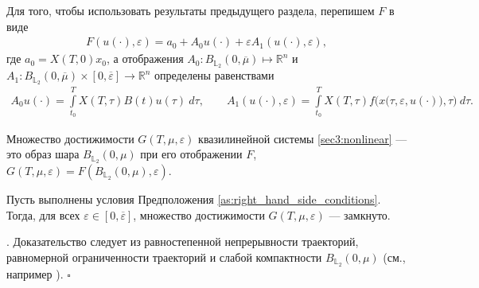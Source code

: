\documentclass[../main.tex]{subfiles}
\begin{document}
Для того, чтобы использовать результаты предыдущего раздела, перепишем  $F$ в виде
\begin{gather*}
	F(u(\cdot),\varepsilon) = a_0 + A_0 u(\cdot) + \varepsilon A_1(u(\cdot), \varepsilon), 
\end{gather*}
где $a_0 = X(T,0)x_0 $, а отображения $A_0: B_{\mathbb{L}_2}(0,\overline{\mu})  \mapsto \mathbb{R}^n$ и $A_1: B_{\mathbb{L}_2}(0,\overline{\mu}) \times [0,\overline{\varepsilon}] \to \mathbb{R}^n$ определены равенствами
\begin{gather}\label{A1_def}
	A_0 u(\cdot) = \int\limits_{t_0}^T X(T,\tau) B(t)u(\tau)\ d\tau, \qquad
	A_1(u(\cdot),\varepsilon) = \int\limits_{t_0}^T X(T,\tau) f\Big(x\big(\tau,\varepsilon, u(\cdot)\big),\tau\Big) \ d\tau.
\end{gather}

Множество достижимости $G(T,\mu,\varepsilon) $  квазилинейной системы \eqref{sec3:nonlinear} --- это образ шара $B_{\mathbb{L}_2}(0,\mu)$ при его отображении $F$, $G(T,\mu,\varepsilon) = F(B_{\mathbb{L}_2}(0,\mu),\varepsilon)$.

\begin{utv}\label{ReachableSetcloseness}
	Пусть выполнены условия Предположения \ref{as:right_hand_side_conditions}. Тогда, для всех $\varepsilon\in [0,\overline{\varepsilon}]$, множество достижимости $G(T,\mu,\varepsilon) $ --- замкнуто.
\end{utv}
\doc. 
Доказательство следует из равностепенной непрерывности траекторий, равномерной ограниченности траекторий и слабой компактности $B_{\mathbb{L}_2}(0,\mu)$ (см., например \cite{GusZyk}).
\hfill$\square$\\[1ex]%
\end{document}
